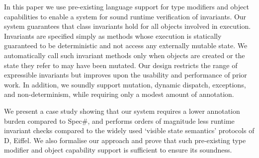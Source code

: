 In this paper we use pre-existing language support for type modifiers and object capabilities to enable a system for sound runtime verification of invariants.
Our system guarantees that class invariants hold for all objects involved in execution.
Invariants are specified simply as methods whose execution is statically guaranteed to be deterministic and not access any externally mutable state.
We automatically call such invariant methods only when objects are created or the state they refer to may have been mutated.
Our design restricts the range of expressible invariants but improves upon the usability and performance of  prior work.
In addition, we soundly support mutation, dynamic dispatch, exceptions, and non-determinism, while requiring only a modest amount of annotation.

We present a case study showing that our system requires a lower annotation burden compared to Spec\#, and  performs orders of magnitude less runtime invariant checks compared to the widely used `visible state semantics' protocols of D, Eiffel.
We also formalise our approach and prove that such pre-existing type modifier and object capability support is sufficient to ensure its soundness. 